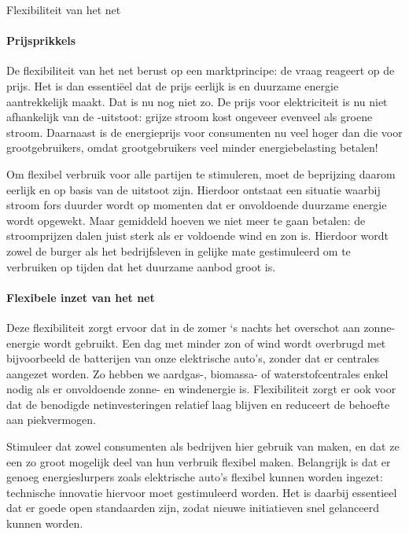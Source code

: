 \begin{voorstel}{Flexibiliteit van het net}
\begin{multicols*}{2}
\begin{overwegingen}
\paragraph{Prijsprikkels}
De flexibiliteit van het net berust op een marktprincipe: de vraag reageert op de prijs. Het is dan essentiëel dat de prijs eerlijk is en duurzame energie aantrekkelijk maakt. Dat is nu nog niet zo. De prijs voor elektriciteit is nu niet afhankelijk van de \COO-uitstoot: grijze stroom kost ongeveer evenveel als groene stroom. Daarnaast is de energieprijs voor consumenten nu veel hoger dan die voor grootgebruikers, omdat grootgebruikers veel minder energiebelasting betalen!

Om flexibel verbruik voor alle partijen te stimuleren, moet de beprijzing daarom eerlijk en op basis van de uitstoot zijn. Hierdoor ontstaat een situatie waarbij stroom fors duurder wordt op momenten dat er onvoldoende duurzame energie wordt opgewekt. Maar gemiddeld hoeven we niet meer te gaan betalen: de stroomprijzen dalen juist sterk als er voldoende wind en zon is. Hierdoor wordt zowel de burger als het bedrijfsleven in gelijke mate gestimuleerd om te verbruiken op tijden dat het duurzame aanbod groot is.

\paragraph{Flexibele inzet van het net}
Deze flexibiliteit zorgt ervoor dat in de zomer ‘s nachts het overschot aan zonne-energie wordt gebruikt. Een dag met minder zon of wind wordt overbrugd met bijvoorbeeld de batterijen van onze elektrische auto’s, zonder dat er centrales aangezet worden. Zo hebben we aardgas-, biomassa- of waterstofcentrales enkel nodig als er onvoldoende zonne- en windenergie is. Flexibiliteit zorgt er ook voor dat de benodigde netinvesteringen relatief laag blijven en reduceert de behoefte aan piekvermogen.



\end{overwegingen}

\begin{aanbevelingen}
Stimuleer dat zowel consumenten als bedrijven hier gebruik van maken, en dat ze een zo groot mogelijk deel van hun verbruik flexibel maken. Belangrijk is dat er genoeg energieslurpers zoals elektrische auto's flexibel kunnen worden ingezet: technische innovatie hiervoor moet gestimuleerd worden. Het is daarbij essentieel dat er goede open standaarden zijn, zodat nieuwe initiatieven snel gelanceerd kunnen worden.


\end{aanbevelingen}
\end{multicols*}
\end{voorstel}
